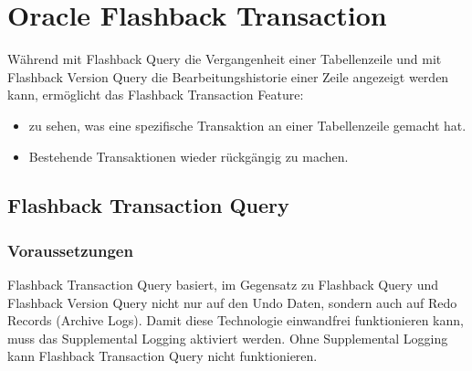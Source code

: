     \section{Oracle Flashback Transaction}
      W\"ahrend mit Flashback Query die Vergangenheit einer Tabellenzeile und mit Flashback Version Query die Bearbeitungshistorie einer Zeile angezeigt werden kann, erm\"oglicht das Flashback Transaction Feature:
        \begin{itemize}
          \item zu sehen, was eine spezifische Transaktion an einer Tabellenzeile gemacht hat.
          \item Bestehende Transaktionen wieder r\"uckg\"angig zu machen.
        \end{itemize}
      \subsection{Flashback Transaction Query}
        \subsubsection{Voraussetzungen}
          Flashback Transaction Query basiert, im Gegensatz zu Flashback Query und Flashback Version Query nicht nur auf den Undo Daten, sondern auch auf Redo Records (Archive Logs). Damit diese Technologie einwandfrei funktionieren kann, muss das Supplemental Logging aktiviert werden. Ohne Supplemental Logging kann Flashback Transaction Query nicht funktionieren.
\clearpage
